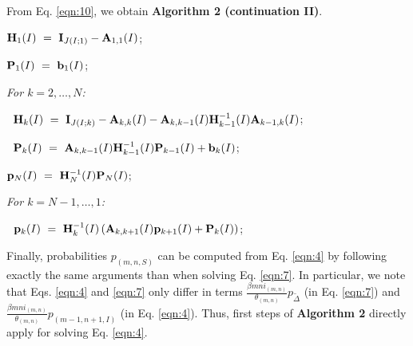 \documentclass[10pt,A4paper]{article}
\begin{document}
\par From Eq. \eqref{eqn:10}, we obtain {\bf Algorithm 2 (continuation II)}.\\

\vspace{0.5cm}
\par {}
\begin{description}
  \item ${\bf H}_1(I) ~=~ {\bf I}_{J(I;1)}-{\bf A}_{1,1}(I)$;
  \item ${\bf P}_1(I) ~=~ {\bf b}_1(I)$;
  \item \it For $k=2,\dots,N$:
  \item $~$\hspace{0.5cm} ${\bf H}_k(I) ~=~ {\bf I}_{J(I;k)}-{\bf A}_{k,k}(I)-{\bf A}_{k,k-1}(I){\bf H}_{k-1}^{-1}(I){\bf A}_{k-1,k}(I)$;
  \item $~$\hspace{0.5cm} ${\bf P}_k(I) ~=~ {\bf A}_{k,k-1}(I){\bf H}_{k-1}^{-1}(I){\bf P}_{k-1}(I)+{\bf b}_k(I)$;
  \item ${\bf p}_{N}(I) ~=~ {\bf H}_{N}^{-1}(I){\bf P}_{N}(I)$;
  \item \it For $k=N-1,\dots,1$:
  \item $~$\hspace{0.5cm} ${\bf p}_k(I) ~=~ {\bf H}_k^{-1}(I)\left({\bf A}_{k,k+1}(I){\bf p}_{k+1}(I)+{\bf P}_k(I)\right)$;
\end{description}
\vspace{0.5cm}

\par Finally, probabilities $p_{(m,n,S)}$ can be computed from Eq. \eqref{eqn:4} by following exactly the same arguments than when solving Eq. \eqref{eqn:7}. In
particular, we note that Eqs. \eqref{eqn:4} and \eqref{eqn:7} only differ in terms $\frac{\beta mni_{(m,n)}}{\theta_{(m,n)}}p_{{\tilde \Delta}}$ (in Eq. \eqref{eqn:7})
and $\frac{\beta mni_{(m,n)}}{\theta_{(m,n)}}p_{(m-1,n+1,I)}$ (in Eq. \eqref{eqn:4}). Thus, first steps of {\bf Algorithm 2} directly apply for solving
Eq. \eqref{eqn:4}.


\end{document}
